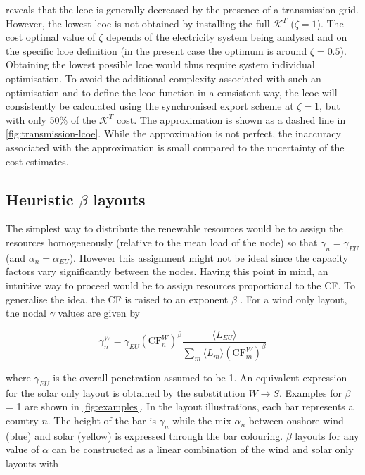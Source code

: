 \documentclass[a4paper, 5p, sort&compress]{elsarticle}%
\newcommand{\paren}[1]{\left(#1\right)}
\begin{document}
 reveals that the \gls{lcoe} is generally
decreased by the presence of a transmission grid. However, the lowest
\gls{lcoe} is not obtained by installing the full $\mathcal{K}^{T}$
($\zeta = 1$). The cost optimal value of $\zeta$ depends of the electricity
system being analysed and on the specific \gls{lcoe} definition (in the
present case the optimum is around $\zeta= 0.5$). Obtaining the lowest
possible \gls{lcoe} would thus require system individual optimisation. To
avoid the additional complexity associated with such an optimisation
and to define the \gls{lcoe} function in a consistent way, the \gls{lcoe} will
consistently be calculated using the synchronised export scheme at
$\zeta=1$, but with only 50\% of the $\mathcal{K}^{T}$ cost. The
approximation is shown as a dashed line in
\cref{fig:transmission-lcoe}. While the approximation is not perfect,
the inaccuracy associated with the approximation is small
compared to the uncertainty of the cost estimates.

\subsection{Heuristic $\beta$ layouts}
\label{sec:beta-layout}

The simplest way to distribute the renewable resources would be to
assign the resources homogeneously (relative to the mean load of the
node) so that $\gamma_{n} = \gamma_{EU}$ (and $\alpha_{n} = \alpha_{EU}$). However this assignment
might not be ideal since the capacity factors vary significantly
between the nodes. Having this point in mind, an intuitive way to
proceed would be to assign resources proportional to the CF. To
generalise the idea, the CF is raised to an exponent $\beta$ %
\cite{Rolando}. For a wind only layout, the nodal $\gamma$ values are given by

\begin{equation}
  \label{eq:8}
  \gamma_{n}^{W} = \gamma_{EU} \paren{\text{CF}^{W}_{n}}^{\beta} \frac{\langle L_{EU}
    \rangle}{\sum_{m} \langle L_{m}
    \rangle \paren{\text{CF}^{W}_{m}}^{\beta}}
\end{equation}

where $\gamma_{EU}$ is the overall penetration assumed to be 1. An equivalent
expression for the solar only layout is obtained by the substitution
$W \to S$. Examples for $\beta$ = 1 are shown in \cref{fig:examples}. In
the layout illustrations, each bar represents a country $n$. The
height of the bar is $\gamma_{n}$ while the mix $\alpha_{n}$ between onshore
wind (blue) and solar (yellow) is expressed through the bar
colouring. $\beta$ layouts for any value of $\alpha$ can be constructed as a
linear combination of the wind and solar only layouts with
\end{document}
